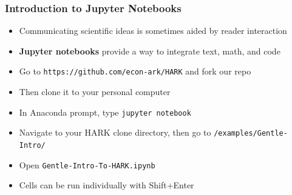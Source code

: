 \documentclass[aspectratio=169]{beamer}
\begin{document}

\begin{frame}
\frametitle{Introduction to Jupyter Notebooks}
\begin{itemize}
	\item Communicating scientific ideas is sometimes aided by reader interaction
	
	\item \textbf{Jupyter notebooks} provide a way to integrate text, math, and code
	
	\item <2->Go to \texttt{https://github.com/econ-ark/HARK} and fork our repo
	
	\item <2->Then clone it to your personal computer
	
	\item <3->In Anaconda prompt, type \texttt{jupyter notebook}
	
	\item <3->Navigate to your HARK clone directory, then go to \texttt{/examples/Gentle-Intro/}
	
	\item <3->Open \texttt{Gentle-Intro-To-HARK.ipynb}
	
	\item <4->Cells can be run individually with Shift+Enter
\end{itemize}
\end{frame}
\end{document}
